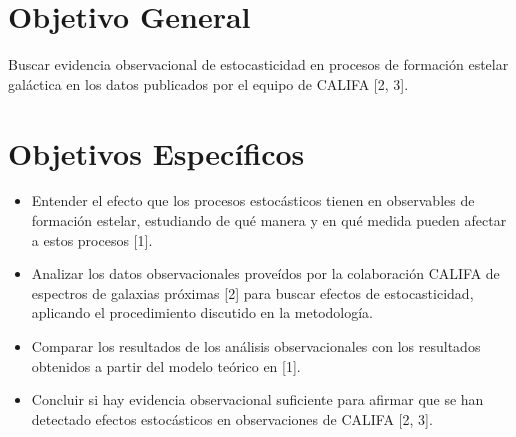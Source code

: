 \documentclass[12pt]{article}
\begin{document}






\section{Objetivo General}

Buscar evidencia observacional de estocasticidad en procesos de
formaci\'on estelar gal\'actica en los datos publicados por el equipo de CALIFA [2, 3].




\section{Objetivos Espec\'ificos}


\begin{itemize}
	\item Entender el efecto que los procesos estoc\'asticos
          tienen en observables de formaci\'on estelar, estudiando de qu\'e manera y en qu\'e medida pueden afectar
					a estos procesos [1].
	\item Analizar los datos observacionales prove\'idos por la
          colaboraci\'on CALIFA de espectros de galaxias pr\'oximas [2]
          para buscar efectos de estocasticidad, aplicando el procedimiento discutido en la metodolog\'ia.
	\item Comparar los resultados de los an\'alisis
          observacionales con los resultados obtenidos a partir del modelo te\'orico en [1].
  \item Concluir si hay evidencia observacional suficiente para
          afirmar que se han detectado efectos estoc\'asticos en
          observaciones de CALIFA [2, 3].
\end{itemize}
\end{document}
